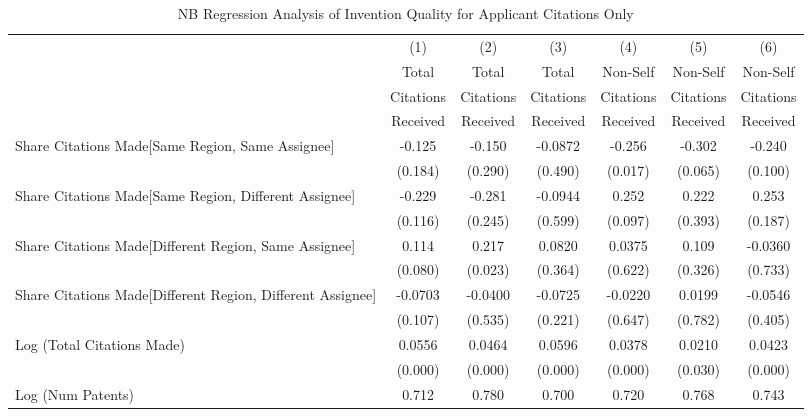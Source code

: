 {
\begin{longtable}{l*{6}{c}}
\caption{NB Regression Analysis of Invention Quality for Applicant Citations Only \label{a.model123192021}}\\
\hline\hline\endfirsthead\hline\endhead\hline\endfoot\endlastfoot
                &\multicolumn{1}{c}{(1)}&\multicolumn{1}{c}{(2)}&\multicolumn{1}{c}{(3)}&\multicolumn{1}{c}{(4)}&\multicolumn{1}{c}{(5)}&\multicolumn{1}{c}{(6)}\\
                &\multicolumn{1}{c}{Total}&\multicolumn{1}{c}{Total}&\multicolumn{1}{c}{Total}&\multicolumn{1}{c}{Non-Self}&\multicolumn{1}{c}{Non-Self}&\multicolumn{1}{c}{Non-Self}\\
                &\multicolumn{1}{c}{Citations}&\multicolumn{1}{c}{Citations}&\multicolumn{1}{c}{Citations}&\multicolumn{1}{c}{Citations}&\multicolumn{1}{c}{Citations}&\multicolumn{1}{c}{Citations}\\
                 &\multicolumn{1}{c}{Received}&\multicolumn{1}{c}{Received}&\multicolumn{1}{c}{Received}&\multicolumn{1}{c}{Received}&\multicolumn{1}{c}{Received}&\multicolumn{1}{c}{Received}\\
\hline
Share Citations Made[Same Region, Same Assignee]&   -0.125&   -0.150&  -0.0872&   -0.256&   -0.302&   -0.240\\
                &  (0.184)&  (0.290)&  (0.490)&  (0.017)&  (0.065)&  (0.100)\\
Share Citations Made[Same Region, Different Assignee]&   -0.229&   -0.281&  -0.0944&    0.252&    0.222&    0.253\\
                &  (0.116)&  (0.245)&  (0.599)&  (0.097)&  (0.393)&  (0.187)\\
Share Citations Made[Different Region, Same Assignee]&    0.114&    0.217&   0.0820&   0.0375&    0.109&  -0.0360\\
                &  (0.080)&  (0.023)&  (0.364)&  (0.622)&  (0.326)&  (0.733)\\
Share Citations Made[Different Region, Different Assignee]&  -0.0703&  -0.0400&  -0.0725&  -0.0220&   0.0199&  -0.0546\\
                &  (0.107)&  (0.535)&  (0.221)&  (0.647)&  (0.782)&  (0.405)\\
Log (Total Citations Made)&   0.0556&   0.0464&   0.0596&   0.0378&   0.0210&   0.0423\\
                &  (0.000)&  (0.000)&  (0.000)&  (0.000)&  (0.030)&  (0.000)\\
Log (Num Patents)&    0.712&    0.780&    0.700&    0.720&    0.768&    0.743\\

\end{longtable}}
